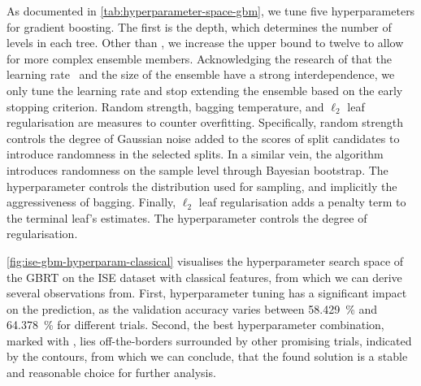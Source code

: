 As documented in \cref{tab:hyperparameter-space-gbm}, we tune five hyperparameters for gradient boosting. The first is the depth, which determines the number of levels in each tree. Other than \textcite[][]{gorishniyRevisitingDeepLearning2021}, we increase the upper bound to twelve to allow for more complex ensemble members. Acknowledging the research of \textcite[][14]{friedmanGreedyFunctionApproximation2001} that the learning rate \eta~and the size of the ensemble have a strong interdependence, we only tune the learning rate and stop extending the ensemble based on the early stopping criterion. Random strength, bagging temperature, and $\ell_2$ leaf regularisation are measures to counter overfitting. Specifically, random strength controls the degree of Gaussian noise added to the scores of split candidates to introduce randomness in the selected splits. In a similar vein, the algorithm introduces randomness on the sample level through Bayesian bootstrap. The hyperparameter controls the distribution used for sampling, and implicitly the aggressiveness of bagging. Finally, $\ell_2$ leaf regularisation adds a penalty term to the terminal leaf's estimates. The hyperparameter controls the degree of regularisation.

\cref{fig:ise-gbm-hyperparam-classical} visualises the hyperparameter search space of the \gls{GBRT} on the \gls{ISE} dataset with classical features, from which we can derive several observations from. First, hyperparameter tuning has a significant impact on the prediction, as the validation accuracy varies between \SI{58.429}{\percent} and \SI{64.378}{\percent} for different trials. Second, the best hyperparameter combination, marked with \bestcircle, lies off-the-borders surrounded by other promising trials, indicated by the contours, from which we can conclude, that the found solution is a stable and reasonable choice for further analysis.


